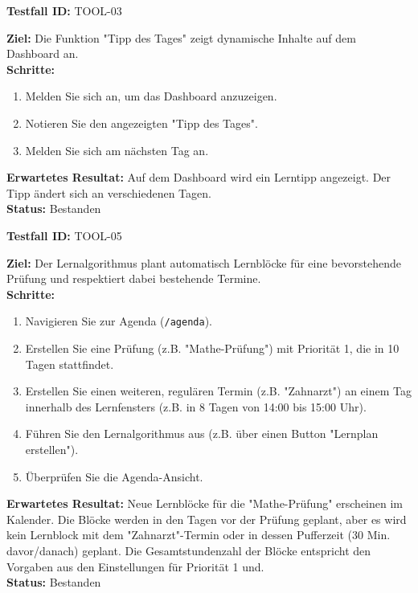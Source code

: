 \documentclass[11pt, a4paper]{article}
\newenvironment{testcase}[1]{%
    \par\vspace{1em}\noindent\begin{minipage}{\linewidth}
    \textbf{Testfall ID:} #1 \\
    \vspace{0.2em}
}{\end{minipage}\par\vspace{1em}}
\begin{document}
\begin{testcase}{TOOL-03}
    \textbf{Ziel:} Die Funktion "Tipp des Tages" zeigt dynamische Inhalte auf dem Dashboard an.\\
    \textbf{Schritte:}
    \begin{enumerate}[label=\arabic*.]
        \item Melden Sie sich an, um das Dashboard anzuzeigen.
        \item Notieren Sie den angezeigten "Tipp des Tages".
        \item Melden Sie sich am nächsten Tag an.
    \end{enumerate}
    \textbf{Erwartetes Resultat:} Auf dem Dashboard wird ein Lerntipp angezeigt. Der Tipp ändert sich an verschiedenen Tagen.\\
    \vspace{0.5em}\textbf{Status:} \textcolor{passcolor}{Bestanden}
\end{testcase}

\begin{testcase}{TOOL-05}
    \textbf{Ziel:} Der Lernalgorithmus plant automatisch Lernblöcke für eine bevorstehende Prüfung und respektiert dabei bestehende Termine.\\
    \textbf{Schritte:}
    \begin{enumerate}[label=\arabic*.]
        \item Navigieren Sie zur Agenda (\texttt{/agenda}).
        \item Erstellen Sie eine Prüfung (z.B. "Mathe-Prüfung") mit Priorität 1, die in 10 Tagen stattfindet.
        \item Erstellen Sie einen weiteren, regulären Termin (z.B. "Zahnarzt") an einem Tag innerhalb des Lernfensters (z.B. in 8 Tagen von 14:00 bis 15:00 Uhr).
        \item Führen Sie den Lernalgorithmus aus (z.B. über einen Button "Lernplan erstellen").
        \item Überprüfen Sie die Agenda-Ansicht.
    \end{enumerate}
    \textbf{Erwartetes Resultat:} Neue Lernblöcke für die "Mathe-Prüfung" erscheinen im Kalender. Die Blöcke werden in den Tagen vor der Prüfung geplant, aber es wird kein Lernblock mit dem "Zahnarzt"-Termin oder in dessen Pufferzeit (30 Min. davor/danach) geplant. Die Gesamtstundenzahl der Blöcke entspricht den Vorgaben aus den Einstellungen für Priorität 1 und.\\
    \vspace{0.5em}\textbf{Status:} \textcolor{passcolor}{Bestanden}
\end{testcase}
\end{document}
